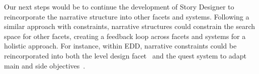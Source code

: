 


Our next steps would be to continue the development of Story Designer to reincorporate the narrative structure into other facets and systems. Following a similar approach with constraints, narrative structures could constrain the search space for other facets, creating a feedback loop across facets and systems for a holistic approach. For instance, within EDD, narrative constraints could be reincorporated into both the level design facet~ and the quest system to adapt main and side objectives~.






